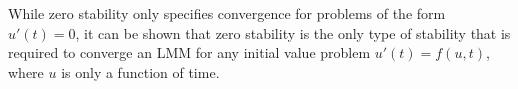 \documentclass[10pt]{article}
\begin{document}
\begin{flushleft}
While zero stability only specifies convergence for problems of the form \(u'(t)=0\), it can be shown that zero stability is the only type of stability that is required to converge an LMM for any initial value problem \(u'(t)=f(u,t)\), where \(u\) is only a function of time.



\end{flushleft}
\end{document}
